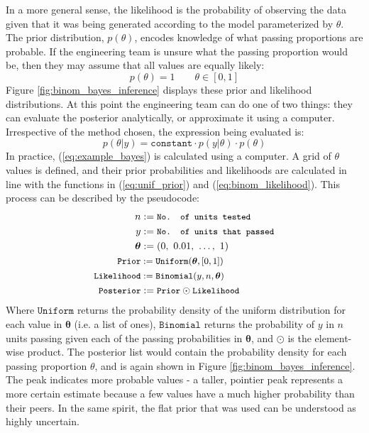 \documentclass[11pt,a4paper,article]{memoir} %
\begin{document}
In a more general sense, the likelihood is the probability of observing the data given that it was being generated according to the model parameterized by $\theta$.
The prior distribution, $p(\theta)$, encodes knowledge of what passing proportions are probable. If the engineering team is unsure what the passing proportion would be, then they may assume that all values are equally likely:
\begin{equation}
  p(\theta) = 1 \qquad \theta \in [0, 1]
  \label{eq:unif_prior}
\end{equation}
Figure \ref{fig:binom_bayes_inference} displays these prior and likelihood distributions. At this point the engineering team can do one of two things: they can evaluate the posterior analytically, or approximate it using a computer. Irrespective of the method chosen, the expression being evaluated is:
\begin{equation}
	p(\theta|y) = \texttt{constant}\cdot p(y|\theta) \cdot p(\theta)
	\label{eq:example_bayes}
\end{equation}
In practice, (\ref{eq:example_bayes}) is calculated using a computer. A grid of $\theta$ values is defined, and their prior probabilities and likelihoods are calculated in line with the functions in (\ref{eq:unif_prior}) and (\ref{eq:binom_likelihood}). This process can be described by the pseudocode:
\begin{align*}
  \quad n &:= \small{\texttt{No. of units tested}} \\
   \quad y &:= \small{\texttt{No. of units that passed}} \\
  \boldsymbol{\theta} & := (0, \ 0.01, \ \dots, \ 1) \\
  \small{\texttt{Prior}} &:= \small{\texttt{Uniform}}(\boldsymbol{\theta}, [0, 1]) \\
  \small{\texttt{Likelihood}} &:= \small{\texttt{Binomial}}(y, n, \boldsymbol{\theta}) \\ 
  \small{\texttt{Posterior}} &:= \small{\texttt{Prior} \odot \texttt{Likelihood}}
\end{align*}
Where $\texttt{Uniform}$ returns the probability density of the uniform distribution for each value in $\boldsymbol{\theta}$ (i.e. a list of ones), $\texttt{Binomial}$ returns the probability of $y$ in $n$ units passing given each of the passing probabilities in $\boldsymbol{\theta}$, and $\odot$ is the element-wise product.
The posterior list would contain the probability density for each passing proportion $\theta$, and is again shown in Figure \ref{fig:binom_bayes_inference}. The peak indicates more probable values - a taller, pointier peak represents a more certain estimate because a few values have a much higher probability than their peers. In the same spirit, the flat prior that was used can be understood as highly uncertain.
\end{document}
